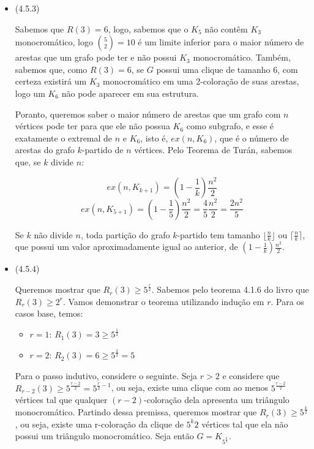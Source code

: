 \documentclass{article}
\begin{document}
\begin{itemize}
\begin{itemize}
	      \end{itemize}
	\item (4.5.3)

	      Sabemos que \(R(3) = 6\), logo, sabemos que o \(K_5\) não contêm \(K_3\) monocromático, logo \(\binom{5}{2} = 10\) é um limite inferior para o maior número de arestas que um grafo
	      pode ter e não possui \(K_3\) monocromático. Também, sabemos que, como \(R(3) = 6\), se \(G\) possui uma clique de tamanho 6, com certeza existirá um \(K_3\) monocromático em uma 2-coloração
	      de suas arestas, logo um \(K_6\) não pode aparecer em sua estrutura.

	      Poranto, queremos saber o maior número de arestas que um grafo com \(n\) vértices pode ter para que ele não possua \(K_6\) como subgrafo, e esse é exatamente o extremal de \(n\) e \(K_6\), isto é, \(ex(n, K_6)\), que é o número de arestas do grafo
	      \(k\)-partido de \(n\) vértices.
	      Pelo Teorema de Turán, sabemos que, se \(k\) divide \(n\):

	      \[ex(n, K_{k+1}) = (1 - \frac{1}{k})\frac{n^2}{2}\]
	      \[ex(n, K_{5+1}) = (1 - \frac{1}{5})\frac{n^2}{2} = \frac{4}{5}\frac{n^2}{2} = \frac{2n^2}{5}\]

	      Se \(k\) não divide \(n\), toda partição do grafo \(k\)-partido tem tamanho \(\lfloor \frac{n}{k} \rfloor\) ou \(\lceil \frac{n}{k} \rceil\), que possui um valor aproximadamente igual ao anterior, de \((1 - \frac{1}{k})\frac{n^2}{2}\).


	\item (4.5.4)

	      Queremos mostrar que \(R_r(3) \geq 5^{\frac{r}{2}}\). Sabemos pelo teorema 4.1.6 do livro que \(R_r(3) \geq 2^r\).
          Vamos demonstrar o teorema utilizando indução em \(r\). Para os casos base, temos:

          \begin{itemize}
              \item $r = 1$: $R_1(3) = 3 \geq 5^{\frac{1}{2}}$
              \item $r = 2$: $R_2(3) = 6 \geq 5^{\frac{2}{2}} = 5$
          \end{itemize}
             
            Para o passo indutivo, considere o seguinte. Seja \(r > 2\) e considere que \(R_{r-2}(3) \geq 5^{\frac{r-2}{2}} = 5^{\frac{r}{2}-1}\), ou seja, existe uma clique com ao menos \(5^{\frac{r-2}{2}}\) vértices tal que qualquer \((r - 2)\)-coloração dela apresenta um triângulo monocromático. Partindo dessa premissa, queremos mostrar que \(R_r(3) \geq 5^{\frac{k}{2}}\), ou seja, existe uma r-coloração da clique de \(5^{k}{2}\) vértices tal que ela não possui um triângulo monocromático. Seja então \(G = K_{5^{\frac{k}{2}}}\).
          

\end{itemize}
\end{document}
